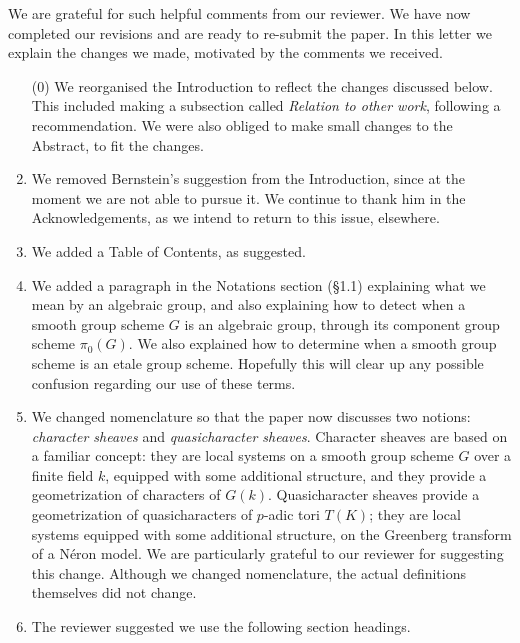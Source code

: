 \documentclass[a4, 10pt]{amsart}
\theoremstyle{definition}
\theoremstyle{remark}
\begin{document}
\rightline{\today}
\medskip

\medskip

We are grateful for such helpful comments from our reviewer. 
We have now completed our revisions and are ready to re-submit the paper. 
In this letter we explain the changes we made, motivated by the comments we received.

\begin{enumerate}
\item[(0)]
We reorganised the Introduction to reflect the changes discussed below. 
This included making a subsection called {\it Relation to other work}, following a recommendation.
We were also obliged to make small changes to the Abstract, to fit the changes.
\item
We removed Bernstein's suggestion from the Introduction, since at the moment we are not able to pursue it. 
We continue to thank him in the Acknowledgements, as we intend to return to this issue, elsewhere.
\item
We added a Table of Contents, as suggested.
\item 
We added a paragraph in the Notations section (\S 1.1) explaining what we mean by an algebraic group, and also explaining how to detect when a smooth group scheme $G$ is an algebraic group, through its component group scheme $\pi_0(G)$.
We also explained how to determine when a smooth group scheme is an etale group scheme.
Hopefully this will clear up any possible confusion regarding our use of these terms.
\item
We changed nomenclature so that the paper now discusses two notions: {\it character sheaves} and {\it quasicharacter sheaves}. Character sheaves are based on a familiar concept: they are local systems on a smooth group scheme $G$ over a finite field $k$, equipped with some additional structure, and they provide a geometrization of characters of $G(k)$.  Quasicharacter sheaves provide a geometrization of quasicharacters of $p$-adic tori $T(K)$; they are local systems equipped with some additional structure, on the Greenberg transform of a N\'eron model. 
We are particularly grateful to our reviewer for suggesting this change.
Although we changed nomenclature, the actual definitions themselves did not change.
\item
The reviewer suggested we use the following section headings.
\begin{enumerate}

\end{enumerate}
\end{enumerate}
\end{document}
